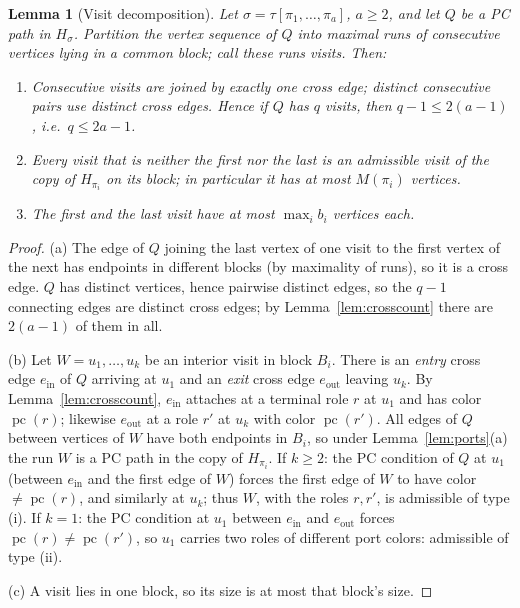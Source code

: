 \documentclass[11pt]{article}
\newtheorem{lemma}[theorem]{Lemma}
\theoremstyle{definition}
\DeclareMathOperator{\pc}{pc}
\begin{document}
\begin{lemma}[Visit decomposition]\label{lem:visits}
Let $\sigma = \tau[\pi_1, \dots, \pi_a]$, $a \ge 2$, and let $Q$ be a PC path in
$H_\sigma$. Partition the vertex sequence of $Q$ into maximal runs of consecutive
vertices lying in a common block; call these runs \emph{visits}. Then:
\begin{enumerate}
\item[(a)] Consecutive visits are joined by exactly one cross edge; distinct
consecutive pairs use distinct cross edges. Hence if $Q$ has $q$ visits, then
$q - 1 \le 2(a-1)$, i.e.\ $q \le 2a - 1$.
\item[(b)] Every visit that is neither the first nor the last is an admissible visit
of the copy of $H_{\pi_i}$ on its block; in particular it has at most $M(\pi_i)$
vertices.
\item[(c)] The first and the last visit have at most $\max_i b_i$ vertices each.
\end{enumerate}
\end{lemma}

\begin{proof}
(a) The edge of $Q$ joining the last vertex of one visit to the first vertex of the
next has endpoints in different blocks (by maximality of runs), so it is a cross
edge. $Q$ has distinct vertices, hence pairwise distinct edges, so the $q-1$
connecting edges are distinct cross edges; by Lemma~\ref{lem:crosscount} there are
$2(a-1)$ of them in all.

(b) Let $W = u_1, \dots, u_k$ be an interior visit in block $B_i$. There is an
\emph{entry} cross edge $e_{\mathrm{in}}$ of $Q$ arriving at $u_1$ and an \emph{exit}
cross edge $e_{\mathrm{out}}$ leaving $u_k$. By Lemma~\ref{lem:crosscount},
$e_{\mathrm{in}}$ attaches at a terminal role $r$ at $u_1$ and has color $\pc(r)$;
likewise $e_{\mathrm{out}}$ at a role $r'$ at $u_k$ with color $\pc(r')$. All edges
of $Q$ between vertices of $W$ have both endpoints in $B_i$, so under
Lemma~\ref{lem:ports}(a) the run $W$ is a PC path in the copy of $H_{\pi_i}$. If
$k \ge 2$: the PC condition of $Q$ at $u_1$ (between $e_{\mathrm{in}}$ and the first
edge of $W$) forces the first edge of $W$ to have color $\ne \pc(r)$, and similarly
at $u_k$; thus $W$, with the roles $r, r'$, is admissible of type (i). If $k = 1$:
the PC condition at $u_1$ between $e_{\mathrm{in}}$ and $e_{\mathrm{out}}$ forces
$\pc(r) \ne \pc(r')$, so $u_1$ carries two roles of different port colors:
admissible of type (ii).

(c) A visit lies in one block, so its size is at most that block's size.
\end{proof}
\end{document}
